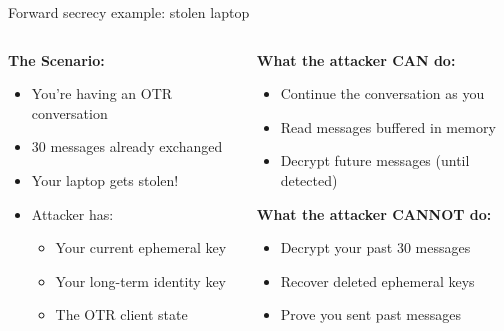 \documentclass[aspectratio=169, lualatex, handout]{beamer}
\begin{document}
\begin{frame}{Forward secrecy example: stolen laptop}
	\begin{columns}[c]
		\begin{column}{0.5\textwidth}
			\textbf{The Scenario:}
			\begin{itemize}
				\item You're having an OTR conversation
				\item 30 messages already exchanged
				\item Your laptop gets stolen!
				\item Attacker has:
				      \begin{itemize}
					      \item Your current ephemeral key
					      \item Your long-term identity key
					      \item The OTR client state
				      \end{itemize}
			\end{itemize}
		\end{column}
		\begin{column}{0.5\textwidth}
			\textbf{What the attacker CAN do:}
			\begin{itemize}
				\item Continue the conversation as you
				\item Read messages buffered in memory
				\item Decrypt future messages (until detected)
			\end{itemize}
			\textbf{What the attacker CANNOT do:}
			\begin{itemize}
				\item Decrypt your past 30 messages
				\item Recover deleted ephemeral keys
				\item Prove you sent past messages
			\end{itemize}
		\end{column}
	\end{columns}
\end{frame}
\end{document}
